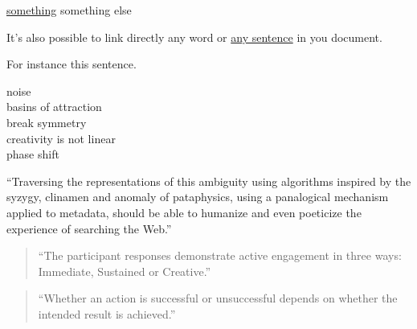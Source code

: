 

\hyperlink{refname}{something}
\hypertarget{refname}{something else}

It's also possible to link directly any word or
\hyperlink{thesentence}{any sentence} in you document.

For instance \hypertarget{thesentence}{this sentence}.



\begin{fcom}
  noise\\
  basins of attraction\\
  break symmetry\\
  creativity is not linear\\
  phase shift\\
  \autocite{Everitt2011}
\end{fcom}


``Traversing the representations of this ambiguity using algorithms inspired by the syzygy, clinamen and anomaly of pataphysics, using a panalogical mechanism applied to metadata, should be able to humanize and even poeticize the experience of searching the Web.'' \autocite{Hendler2013}

\Forward
\MoveDown
\RewindToIndex
\ToTop
\ForwardToEnd
\MoveUp
\RewindToStart
\ForwardToIndex
\Rewind
\ToBottom

\bcloupe





\begin{quote}
  ``The participant responses demonstrate active engagement in three ways: Immediate, Sustained or Creative.'' \autocite{Candy2012}
\end{quote}

\begin{quote}
  ``Whether an action is successful or unsuccessful depends on whether the intended result is achieved.'' \autocite[p.23]{Candy2012}
\end{quote}

